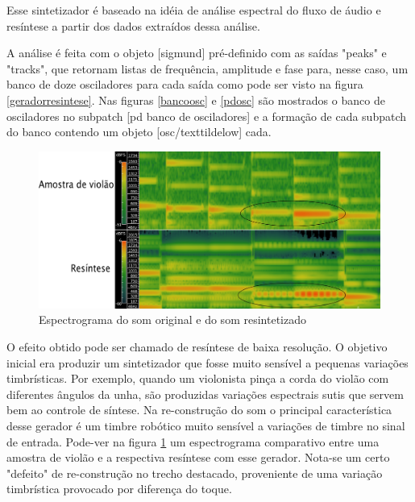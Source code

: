 \documentclass[draft]{ppgmus}
\begin{document}
Esse sintetizador é baseado na idéia de análise espectral do fluxo
de áudio e resíntese a partir dos dados extraídos dessa análise.

A análise é feita com o objeto [sigmund\texttildelow] pré-definido com
as saídas "peaks" e "tracks", que retornam listas de frequência, amplitude e 
fase para, nesse caso, um banco de doze osciladores para cada saída como pode 
ser visto na figura \ref{geradorresintese}.
Nas figuras \ref{bancoosc} e \ref{pdosc} são mostrados o banco de osciladores no subpatch
[pd banco de osciladores] e a formação de cada subpatch do banco contendo um objeto [osc/texttildelow]
cada. 


\begin{figure}
\includegraphics[scale=.5]{spectro}
\caption{Espectrograma do som original e do som resintetizado}
\label{spectro}
\end{figure}
 
O efeito obtido pode ser chamado de resíntese de baixa resolução. O objetivo
inicial era produzir um sintetizador que fosse muito sensível a pequenas
variações timbrísticas. Por exemplo, quando um violonista pinça a corda do violão
com diferentes ângulos da unha, são produzidas variações espectrais sutis que servem
bem ao controle de síntese. Na re-construção do som o principal característica desse
gerador é um timbre robótico muito sensível a variações de timbre no sinal de entrada.
Pode-ver na figura \ref{spectro} um espectrograma comparativo entre uma amostra
de violão e a respectiva resíntese com esse gerador. Nota-se um certo "defeito"
de re-construção no trecho destacado, proveniente de uma variação timbrística provocado
por diferença do toque. 

\end{document}

